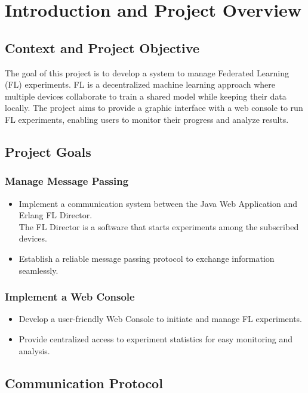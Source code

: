 \chapter{Introduction and Project Overview}

\section{Context and Project Objective}

The goal of this project is to develop a system to manage Federated Learning (FL) experiments. FL is a decentralized machine learning approach where multiple devices collaborate to train a shared model while keeping their data locally. The project aims to provide a graphic interface with a web console to run FL experiments, enabling users to monitor their progress and analyze results.

\section{Project Goals}

\subsection{Manage Message Passing}
\begin{itemize}
    \item Implement a communication system between the Java Web Application and Erlang FL Director.\\
    The FL Director is a software that starts experiments among the subscribed devices.
    \item Establish a reliable message passing protocol to exchange information seamlessly.
\end{itemize}

\subsection{Implement a Web Console}
\begin{itemize}
    \item Develop a user-friendly Web Console to initiate and manage FL experiments.
    \item Provide centralized access to experiment statistics for easy monitoring and analysis.
\end{itemize}

\section{Communication Protocol}

